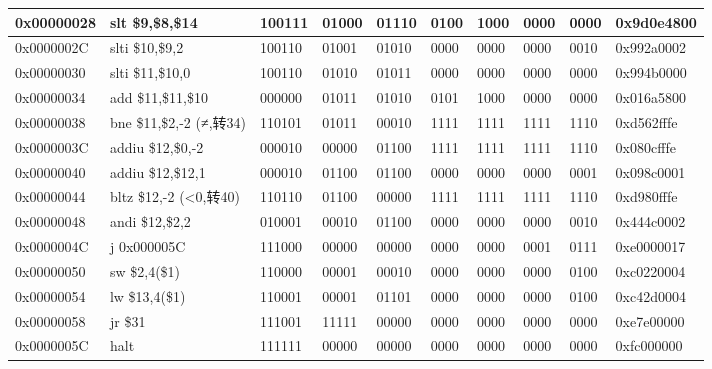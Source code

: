 \begin{table}[htbp]
\begin{tabular}{|l|l|l|l|l|llll|l|}
    \hline
    0x00000028 & slt  \$9,\$8,\$14 & 100111 & 01000 & 01110 & 0100  & 1000  & 0000  & 0000  & 0x9d0e4800 \bigstrut\\
    \hline
    0x0000002C & slti  \$10,\$9,2 & 100110 & 01001 & 01010 & 0000  & 0000  & 0000  & 0010  & 0x992a0002 \bigstrut\\
    \hline
    0x00000030 & slti  \$11,\$10,0 & 100110 & 01010 & 01011 & 0000  & 0000  & 0000  & 0000  & 0x994b0000 \bigstrut\\
    \hline
    0x00000034 & add  \$11,\$11,\$10 & 000000 & 01011 & 01010 & 0101  & 1000  & 0000  & 0000  & 0x016a5800 \bigstrut\\
    \hline
    0x00000038 & bne  \$11,\$2,-2 (≠,转34) & 110101 & 01011 & 00010 & 1111  & 1111  & 1111  & 1110  & 0xd562fffe \bigstrut\\
    \hline
    0x0000003C & addiu  \$12,\$0,-2 & 000010 & 00000 & 01100 & 1111  & 1111  & 1111  & 1110  & 0x080cfffe \bigstrut\\
    \hline
    0x00000040 & addiu  \$12,\$12,1 & 000010 & 01100 & 01100 & 0000  & 0000  & 0000  & 0001  & 0x098c0001 \bigstrut\\
    \hline
    0x00000044 & bltz  \$12,-2 (<0,转40) & 110110 & 01100 & 00000 & 1111  & 1111  & 1111  & 1110  & 0xd980fffe \bigstrut\\
    \hline
    0x00000048 & andi  \$12,\$2,2 & 010001 & 00010 & 01100 & 0000  & 0000  & 0000  & 0010  & 0x444c0002 \bigstrut\\
    \hline
    0x0000004C & j  0x000005C & 111000 & 00000 & 00000 & 0000  & 0000  & 0001  & 0111  & 0xe0000017 \bigstrut\\
    \hline
    0x00000050 & sw  \$2,4(\$1) & 110000 & 00001 & 00010 & 0000  & 0000  & 0000  & 0100  & 0xc0220004 \bigstrut\\
    \hline
    0x00000054 & lw  \$13,4(\$1) & 110001 & 00001 & 01101 & 0000  & 0000  & 0000  & 0100  & 0xc42d0004 \bigstrut\\
    \hline
    0x00000058 & jr  \$31 & 111001 & 11111 & 00000 & 0000  & 0000  & 0000  & 0000  & 0xe7e00000 \bigstrut\\
    \hline
    0x0000005C & halt  & 111111 & 00000 & 00000 & 0000  & 0000  & 0000  & 0000  & 0xfc000000 \bigstrut\\
    \hline
    \end{tabular}%
  \label{tab:test}%
\end{table}%
